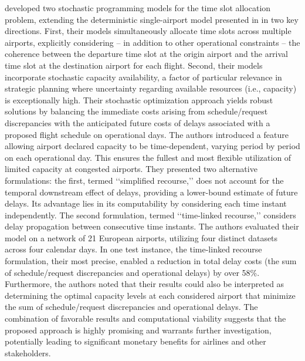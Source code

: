  developed two stochastic programming models for
the time slot allocation problem, extending the deterministic single-airport
model presented in \cite{zografos2012dealing} in two key directions.
%
First, their models simultaneously allocate time slots across multiple airports,
explicitly considering – in addition to other operational constraints – the
coherence between the departure time slot at the origin airport and the arrival
time slot at the destination airport for each flight.
%
Second, their models incorporate stochastic capacity availability, a factor of
particular relevance in strategic planning where uncertainty regarding available
resources (i.e., capacity) is exceptionally high.
%
Their stochastic optimization approach yields robust solutions by balancing the
immediate costs arising from schedule/request discrepancies with the anticipated
future costs of delays associated with a proposed flight schedule on operational
days.
%
The authors introduced a feature allowing airport declared capacity to be
time-dependent, varying period by period on each operational day.
%
This ensures the fullest and most flexible utilization of limited capacity at
congested airports.
%
They presented two alternative formulations: the first, termed ‘‘simplified
recourse,’’ does not account for the temporal downstream effect of delays,
providing a lower-bound estimate of future delays.
%
Its advantage lies in its computability by considering each time instant
independently.
%
The second formulation, termed ‘‘time-linked recourse,’’ considers delay
propagation between consecutive time instants.
%
The authors evaluated their model on a network of 21 European airports,
utilizing four distinct datasets across four calendar days.
%
In one test instance, the time-linked recourse formulation, their most precise,
enabled a reduction in total delay costs (the sum of schedule/request
discrepancies and operational delays) by over 58\%.
%
Furthermore, the authors noted that their results could also be interpreted as
determining the optimal capacity levels at each considered airport that minimize
the sum of schedule/request discrepancies and operational delays.
%
The combination of favorable results and computational viability suggests that
the proposed approach is highly promising and warrants further investigation,
potentially leading to significant monetary benefits for airlines and other
stakeholders.



